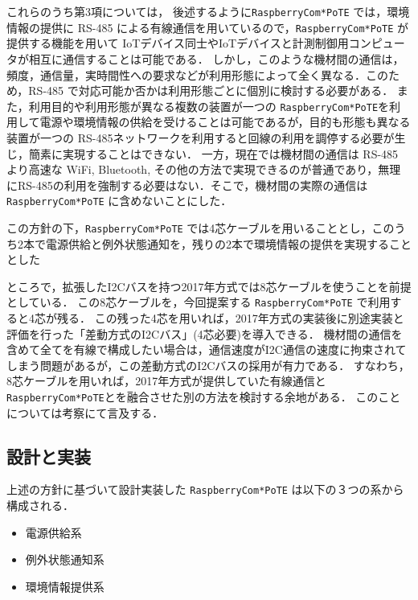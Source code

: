 
これらのうち第3項については，
後述するように{\tt Raspberry\-Com*PoTE} では，環境情報の提供に RS-485 による有線通信を用いているので，{\tt Raspberry\-Com*PoTE} が提供する機能を用いて IoTデバイス同士やIoTデバイスと計測制御用コンピュータが相互に通信することは可能である．
しかし，このような機材間の通信は，頻度，通信量，実時間性への要求などが利用形態によって全く異なる．このため，RS-485 で対応可能か否かは利用形態ごとに個別に検討する必要がある．
また，利用目的や利用形態が異なる複数の装置が一つの {\tt Raspberry\-Com*PoTE}を利用して電源や環境情報の供給を受けることは可能であるが，目的も形態も異なる装置が一つの RS-485ネットワークを利用すると回線の利用を調停する必要が生じ，簡素に実現することはできない．
一方，現在では機材間の通信は RS-485 より高速な WiFi, Bluetooth, その他の方法で実現できるのが普通であり，無理にRS-485の利用を強制する必要はない．そこで，機材間の実際の通信は {\tt Raspberry\-Com*PoTE} に含めないことにした．

この方針の下，{\tt Raspberry\-Com*PoTE} では4芯ケーブルを用いることとし，このうち2本で電源供給と例外状態通知を，残りの2本で環境情報の提供を実現することとした

ところで，拡張したI2Cバスを持つ2017年方式では8芯ケーブルを使うことを前提としている．
この8芯ケーブルを，今回提案する {\tt Raspberry\-Com*PoTE} で利用すると4芯が残る．
この残った4芯を用いれば，2017年方式の実装後に別途実装と評価を行った「差動方式のI2Cバス」(4芯必要)を導入できる．
機材間の通信を含めて全てを有線で構成したい場合は，通信速度がI2C通信の速度に拘束されてしまう問題があるが，この差動方式のI2Cバスの採用が有力である．
すなわち，8芯ケーブルを用いれば，2017年方式が提供していた有線通信と {\tt Raspberry\-Com*PoTE}とを融合させた別の方法を検討する余地がある．
このことについては考察にて言及する．



\subsection{設計と実装}

上述の方針に基づいて設計実装した {\tt Raspberry\-Com*PoTE} は以下の３つの系から構成される．

\begin{itemize}
\item 電源供給系
\item 例外状態通知系
\item 環境情報提供系
\end{itemize}

